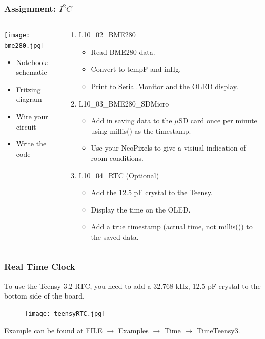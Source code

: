 \documentclass{beamer}
\begin{document}
\begin{frame}\frametitle{Assignment: $I^{2}C$}
\begin{columns}
\begin{column}{4.5cm}
\begin{center}
\texttt{[image: bme280.jpg]}
\end{center}
\begin{itemize}
\item Notebook: schematic
\item Fritzing diagram
\item Wire your circuit
\item Write the code
\end{itemize}
\end{column}
\begin{column}{7.5cm}
\begin{enumerate}
\item L10\_02\_BME280
	\begin{itemize}
	\item Read BME280 data.
	\item Convert to tempF and inHg.
	\item Print to Serial.Monitor and the OLED display.
\end{itemize}
\item L10\_03\_BME280\_SDMicro
	\begin{itemize}
	\item Add in saving data to the $\mu$SD card once per minute using millis() as the timestamp.
	\item Use your NeoPixels to give a visiual indication of room conditions.
	\end{itemize}
\item L10\_04\_RTC (Optional)
	\begin{itemize}
	\item Add the 12.5 pF crystal to the Teensy.
	\item Display the time on the OLED.
	\item Add a true timestamp (actual time, not millis()) to the saved data.
	\end{itemize}
\end{enumerate}
\end{column}
\end{columns}
\end{frame}

\begin{frame}\frametitle{Real Time Clock}
To use the Teensy 3.2 RTC, you need to add a 32.768 kHz, 12.5 pF crystal to the bottom side of the board. 
\begin{figure}
	\texttt{[image: teensyRTC.jpg]}
\end{figure}
Example can be found at FILE $\rightarrow$ Examples $\rightarrow$ Time $\rightarrow$ TimeTeensy3.
\end{frame}
\end{document}
